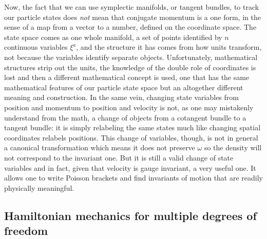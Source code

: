 \documentclass[11pt]{article}
\begin{document}
Now, the fact that we can use symplectic manifolds, or tangent bundles, to track our particle states does \emph{not} mean that conjugate momentum is a one form, in the sense of a map from a vector to a number, defined on the coordinate space. The state space comes as one whole manifold, a set of points identified by $n$ continuous variables $\xi^a$, and the structure it has comes from how units transform, not because the variables identify separate objects. Unfortunately, mathematical structures strip out the units, the knowledge of the double role of coordinates is lost and then a different mathematical concept is used, one that has the same mathematical features of our particle state space but an altogether different meaning and construction. In the same vein, changing state variables from position and momentum to position and velocity is not, as one may mistakenly understand from the math, a change of objects from a cotangent bundle to a tangent bundle: it is simply relabeling the same states much like changing spatial coordinates relabels positions. This change of variables, though, is not in general a canonical transformation which means it does not preserve $\omega$ so the density will not correspond to the invariant one. But it is still a valid change of state variables and in fact, given that velocity is gauge invariant, a very useful one. It allows one to write Poisson brackets and find invariants of motion that are readily physically meaningful\cite{Holten}.

\subsection*{Hamiltonian mechanics for multiple degrees of freedom}
\end{document}

